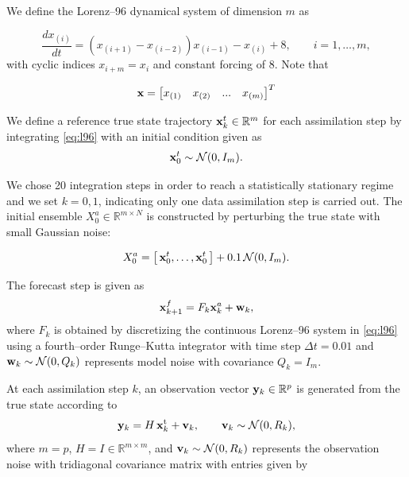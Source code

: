 \documentclass[11p]{elsarticle}
\numberwithin{equation}{section}
\begin{document}
We define the Lorenz--96 dynamical system of dimension \(m\) as

\begin{equation}
\frac{d x_{(i)}}{d t}
= \left( x_{(i+1)} - x_{(i-2)} \right) x_{(i-1)} - x_{(i)} + 8,
\qquad i = 1, \ldots, m,
\label{eq:l96}
\end{equation}
with cyclic indices \(x_{i+m} = x_i\) and constant forcing of $8$.  Note that

\begin{equation}
    {\bf x} = \begin{bmatrix}
        x_{(1)} & x_{(2)} & ... & x_{(m)}
    \end{bmatrix}^T
\end{equation}


We define a reference true state trajectory \({\bf x}_{k}^{t} \in \mathbb{R}^m\) for each assimilation step by integrating \eqref{eq:l96} with an initial condition given as
\begin{equation}
{\bf x}_{0}^{t} \sim \mathcal{N}(0, I_m).
\end{equation}

We chose 20 integration steps in order to reach a statistically stationary regime and we set $k=0,1$, indicating only one data assimilation step is carried out. The initial ensemble \(X_0^{a}\in \mathbb{R}^{m\times N}\) is constructed by perturbing the true state with small Gaussian noise:

\begin{equation}
X_0^{a} = 
\left[\, {\bf x}_{0}^{t}, \ldots, {\bf x}_{0}^{t} \,\right]
+ 0.1\, \mathcal{N}(0, I_m).
\label{eq:init_ens}
\end{equation}

The forecast step is given as 
\begin{equation}
{\bf x}_{k+1}^{f} = F_k  {\bf x}_{k}^{a} + {\bf w}_k,
\label{eq:forecast_model}
\end{equation}
where $F_k$ is obtained by discretizing the continuous Lorenz--96 system in \eqref{eq:l96} using a fourth–order Runge--Kutta integrator with time step
$\Delta t = 0.01$ and \({\bf w}_k \sim \mathcal{N}(0, Q_k)\) represents model noise with covariance \(Q_k = I_m\). 


At each assimilation step $k$, an observation vector ${\bf y}_k \in \mathbb{R}^p$
is generated from the true state according to
\begin{equation}
{\bf y}_k = H\, {\bf x}_k^{\mathrm{t}} + {\bf v}_k,
\qquad
{\bf v}_k \sim \mathcal{N}(0, R_k),
\label{eq:obs_model}
\end{equation}
where $m=p$, \(H = I \in \mathbb{R}^{m\times m}\), and ${\bf v}_k \sim \mathcal{N}(0, R_k)$ represents the observation noise with tridiagonal covariance matrix with entries given by
\end{document}
